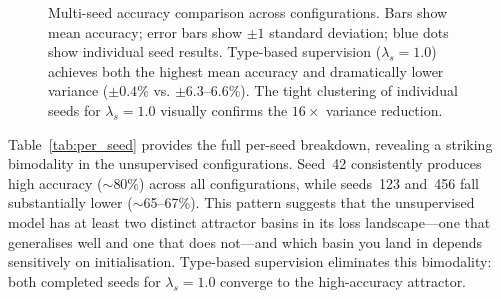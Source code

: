 \documentclass[conference]{IEEEtran}
\begin{document}
\begin{figure}[t]
    \centering
    \caption{Multi-seed accuracy comparison across configurations.
    Bars show mean accuracy; error bars show $\pm 1$ standard
    deviation; blue dots show individual seed results.
    Type-based supervision ($\lambda_s{=}1.0$) achieves both
    the highest mean accuracy and dramatically lower variance
    ($\pm 0.4\%$ vs. $\pm 6.3$--$6.6\%$).  The tight clustering
    of individual seeds for $\lambda_s{=}1.0$ visually confirms
    the $16\times$ variance reduction.}
    \label{fig:multiseed_variance}
\end{figure}

Table~\ref{tab:per_seed} provides the full per-seed breakdown,
revealing a striking bimodality in the unsupervised configurations.
Seed~42 consistently produces high accuracy ($\sim$80\%) across
all configurations, while seeds~123 and~456 fall substantially
lower ($\sim$65--67\%). This pattern suggests that the unsupervised
model has at least two distinct attractor basins in its loss
landscape---one that generalises well and one that does not---and
which basin you land in depends sensitively on initialisation.
Type-based supervision eliminates this bimodality: both completed
seeds for $\lambda_s{=}1.0$ converge to the high-accuracy attractor.
\end{document}
